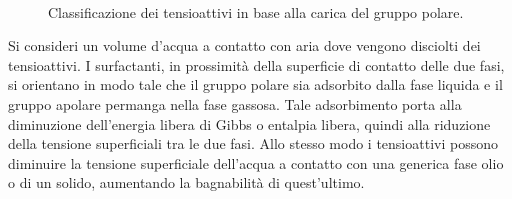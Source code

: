 \begin{figure}[htbp]
    \centering
     \quad
      \\
      \quad
\caption{Classificazione dei tensioattivi in base alla carica del gruppo polare.}
\label{fig:surfactants-classification}
\end{figure}

Si consideri un volume d'acqua a contatto con aria dove vengono disciolti dei tensioattivi. I surfactanti, in prossimità della superficie di contatto delle due fasi, si orientano in modo tale che il gruppo polare sia adsorbito dalla fase liquida e il gruppo apolare permanga nella fase gassosa. Tale adsorbimento porta alla diminuzione dell'energia libera di Gibbs o entalpia libera, quindi alla riduzione della tensione superficiali tra le due fasi. Allo stesso modo i tensioattivi possono diminuire la tensione superficiale dell'acqua a contatto con una generica fase olio o di un solido, aumentando la bagnabilità di quest'ultimo.

